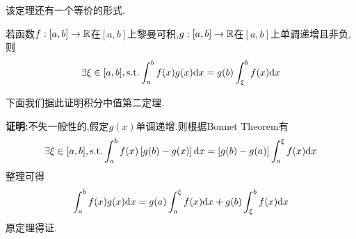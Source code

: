 \documentclass{ctexart}
\begin{document}
该定理还有一个等价的形式.
\begin{theorem}
    若函数$f:[a,b]\to\mathbb{R}$在$[a,b]$上黎曼可积,$g:[a,b]\to\mathbb{R}$在$[a,b]$上单调递增且非负,则
    $$\exists\xi\in[a,b],\text{s.t.}\int_{a}^{b}{f(x)g(x)\mathrm{d} x}=g(b)\int_{\xi}^{b}{f(x)\mathrm{d} x}$$
\end{theorem}\noindent
下面我们据此证明积分中值第二定理.
\begin{solution}
    \textbf{证明:}不失一般性的,假定$g(x)$单调递增.则根据Bonnet Theorem有
    $$\exists\xi\in[a,b],\text{s.t.}\int_{a}^{b}{f(x)\left[g(b)-g(x)\right]\mathrm{d} x}=\left[g(b)-g(a)\right]\int_{a}^{\xi}{f(x)\mathrm{d} x}$$
    整理可得$$\int_{a}^{b}{f(x)g(x)\mathrm{d} x}=g(a)\int_{a}^{\xi}{f(x)\mathrm{d} x}+g(b)\int_{\xi}^{b}{f(x)\mathrm{d} x}$$
    原定理得证.
\end{solution}
\end{document}
